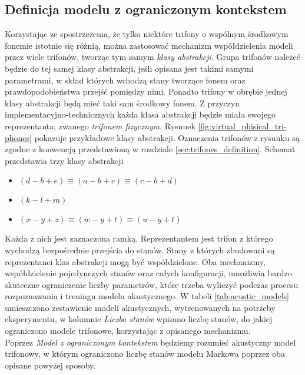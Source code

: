 \documentclass[shortabstract, mgr]{iithesis}
\begin{document}
	\subsection{ Definicja modelu z ograniczonym kontekstem }
		\label{sec:tri-fone_mapping}
		Korzystając ze spostrzeżenia, że tylko niektóre trifony o wspólnym środkowym fonemie istotnie się różnią, można zastosować mechanizm współdzielenia modeli przez wiele trifonów, tworząc tym samym \textit{klasy abstrakcji}. Grupa trifonów należeć będzie do tej samej klasy abstrakcji, jeśli opisana jest takimi samymi parametrami, w skład których wchodzą stany tworzące fonem oraz prawdopodobieństwa przejść pomiędzy nimi. Ponadto trifony w obrębie jednej klasy abstrakcji będą mieć taki sam środkowy fonem. Z przyczyn implementacyjno-technicznych każda klasa abstrakcji będzie miała swojego reprezentanta, zwanego \textit{trifonem fizycznym}. Rysunek \ref{fig:virtual_phisical_tri-phones} pokazuje przykładowe klasy abstrakcji. Oznaczenia trifonów z rysunku są zgodne z konwencją przedstawioną w rozdziale \ref{sec:trifones_definition}. Schemat przedstawia trzy klasy abstrakcji 
		\begin{itemize}
			\item $(d-b+e) \equiv (a-b+c) \equiv (c-b+d)$
			\item $(k-l+m)$ 
			\item $(x-y+z) \equiv (w-y+t) \equiv (u-y+t)$
		\end{itemize} 
		Każda z nich jest zaznaczona ramką. Reprezentantem jest trifon z którego wychodzą bezpośrednie przejścia do stanów. Stany z których zbudowani są reprezentanci klas abstrakcji mogą być współdzielone. Oba mechanizmy, współdzielenie pojedynczych stanów oraz całych konfiguracji, umożliwia bardzo skuteczne ograniczenie liczby parametrów, które trzeba wyliczyć podczas procesu rozpoznawania i treningu modelu akustycznego. W tabeli \ref{tab:acustic_models} umieszczono zestawienie modeli akustycznych, wytrenowanych na potrzeby eksperymentu, w kolumnie \textit{Liczba stanów} wpisano liczbę stanów, do jakiej ograniczono modele trifonowe, korzystając z opisanego mechanizmu. \\
		Poprzez \textit{Model z ograniczonym kontekstem} będziemy rozumieć akustyczny model trifonowy, w którym ograniczono liczbę stanów modelu Markowa poprzez oba opisane powyżej sposoby.
		
\end{document}
